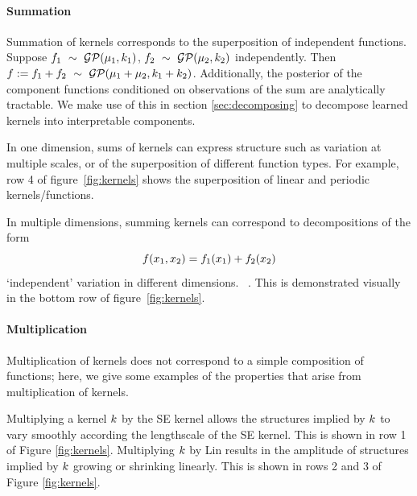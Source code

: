 \documentclass[twoside]{article}
\begin{document}
\paragraph{Summation}

Summation of kernels corresponds to the superposition of independent functions.
Suppose ${f_1 \ \sim\  \mathcal{GP}(\mu_1, k_1)}$, ${f_2 \ \sim\  \mathcal{GP}(\mu_2, k_2)}$ independently.
Then ${f := f_1 + f_2 \ \sim\  \mathcal{GP}(\mu_1 + \mu_2, k_1 + k_2)}$.
Additionally, the posterior of the component functions conditioned on observations of the sum are analytically tractable.
We make use of this in section \ref{sec:decomposing} to decompose learned kernels into interpretable components.


In one dimension, sums of kernels can express structure such as variation at multiple scales, or of the superposition of different function types.
For example, row 4 of figure~\ref{fig:kernels} shows the superposition of linear and periodic kernels/functions.

In multiple dimensions, summing kernels can correspond to decompositions of the form
\begin{equation}
f(x_1, x_2) = f_1(x_1) + f_2(x_2)
\end{equation}
\ie `independent' variation in different dimensions.
~\citep{hastie1990generalized}.
%
%
%
This is demonstrated visually in the bottom row of figure~\ref{fig:kernels}.


\paragraph{Multiplication}

Multiplication of kernels does not correspond to a simple composition of functions; here, we give some examples of the properties that arise from multiplication of kernels.
%
%

Multiplying a kernel $k$ by the SE kernel allows the structures implied by $k$ to vary smoothly according the lengthscale of the SE kernel.
This is shown in row 1 of Figure \ref{fig:kernels}.
Multiplying $k$ by Lin results in the amplitude of structures implied by $k$ growing or shrinking linearly.
This is shown in rows 2 and 3 of Figure \ref{fig:kernels}.
%
\end{document}

